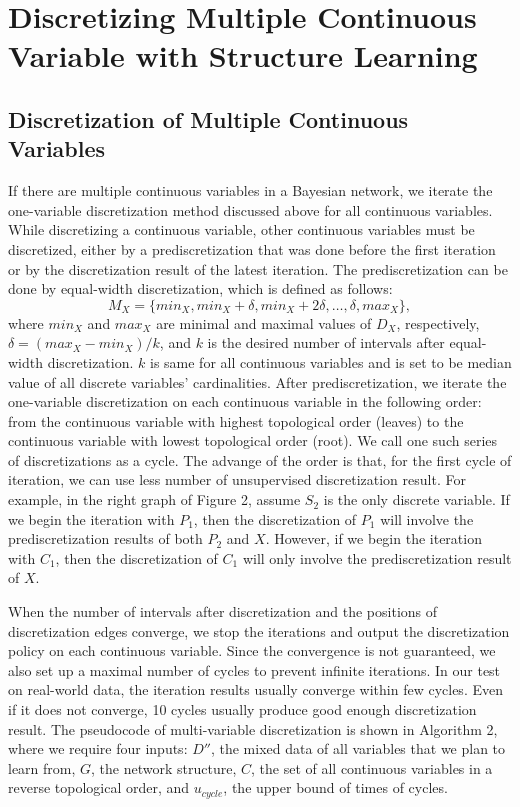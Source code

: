 {\section{Discretizing Multiple Continuous Variable with Structure Learning}
\label{DMC_SL}
\subsection{Discretization of Multiple Continuous Variables}
\label{DMC}
If there are multiple continuous variables in a Bayesian network, we iterate the one-variable discretization method discussed above for all continuous variables. While discretizing a continuous variable, other continuous variables must be discretized, either by a prediscretization that was done before the first iteration or by the discretization result of the latest iteration. The prediscretization can be done by equal-width discretization, which is defined as follows:
\begin{equation}
M_X =  \{ min_X, min_X + \delta, min_X + 2\delta, \ldots, \delta, max_X \},
\end{equation}
where $min_X$ and $max_X$ are minimal and maximal values of $D_X$, respectively, $\delta =  (max_X - min_X)/k$, and $k$ is the desired number of intervals after equal-width discretization. $k$ is same for all continuous variables and is set to be median value of all discrete variables' cardinalities. After prediscretization, we iterate the one-variable discretization on each continuous variable in the following order: from the continuous variable with highest topological order (leaves) to the continuous variable with lowest topological order (root). We call one such series of discretizations as a cycle. The advange of the order is that, for the first cycle of iteration, we can use less number of unsupervised discretization result. For example, in the right graph of Figure 2, assume $S_2$ is the only discrete variable. If we begin the iteration with $P_1$, then the discretization of $P_1$ will involve the prediscretization results of both $P_2$ and $X$. However, if we begin the iteration with $C_1$, then the discretization of $C_1$ will only involve the prediscretization result of $X$.

When the number of intervals after discretization and the positions of discretization edges converge, we stop the iterations and output the discretization policy on each continuous variable. Since the convergence is not guaranteed, we also set up a maximal number of cycles to prevent infinite iterations. In our test on real-world data, the iteration results usually converge within few cycles. Even if it does not converge, 10 cycles usually produce good enough discretization result. The pseudocode of multi-variable discretization is shown in Algorithm 2, where we require four inputs: $D''$, the mixed data of all variables that we plan to learn from, $G$, the network structure, $C$, the set of all continuous variables in a reverse topological order, and $u_{cycle}$, the upper bound of times of cycles.

}
